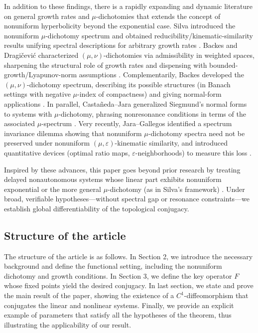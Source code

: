 \documentclass[9pt]{amsart}
\numberwithin{equation}{section}
\numberwithin{lemma}{section}
\begin{document}
 In addition to these findings, there is a rapidly expanding and dynamic literature on general growth rates and $\mu$-dichotomies that extends the concept of nonuniform hyperbolicity beyond the exponential case. Silva introduced the nonuniform $\mu$-dichotomy spectrum and obtained reducibility/kinematic-similarity results unifying spectral descriptions for arbitrary growth rates \cite{Silva}. Backes and Dragičević characterized $(\mu,\nu)$-dichotomies via admissibility in weighted spaces, sharpening the structural role of growth rates and dispensing with bounded-growth/Lyapunov-norm assumptions \cite{BackesDragicevicAdmissibility}. Complementarily, Backes developed the $(\mu,\nu)$-dichotomy spectrum, describing its possible structures (in Banach settings with negative $\mu$-index of compactness) and giving normal-form applications \cite{BackesJMAA2025}. In parallel, Castañeda–Jara generalized Siegmund’s normal forms to systems with $\mu$-dichotomy, phrasing nonresonance conditions in terms of the associated $\mu$-spectrum \cite{CJ}. Very recently, Jara–Gallegos identified a spectrum invariance dilemma showing that nonuniform $\mu$-dichotomy spectra need not be preserved under nonuniform $(\mu,\varepsilon)$-kinematic similarity, and introduced quantitative devices (optimal ratio maps, $\varepsilon$-neighborhoods) to measure this loss \cite{GJ}.

 

 Inspired by these advances, this paper goes beyond prior research by treating delayed nonautonomous systems whose linear part exhibits nonuniform exponential or the more general $\mu$-dichotomy (as in Silva’s framework) \cite{Silva}. Under broad, verifiable hypotheses—without spectral gap or resonance constraints—we establish global differentiability of the topological conjugacy.
 
\subsection*{Structure of the article}

The structure of the article is as follows. In Section 2, we introduce the necessary background and define the functional setting, including the nonuniform dichotomy and growth conditions. In Section 3, we define the key operator $F$ whose fixed points yield the desired conjugacy. In last section, we state and prove the main result of the paper, showing the existence of a $C^1$-diffeomorphism that conjugates the linear and nonlinear systems. Finally, we provide an explicit example of parameters that satisfy all the hypotheses of the theorem, thus illustrating the applicability of our result.
\end{document}
